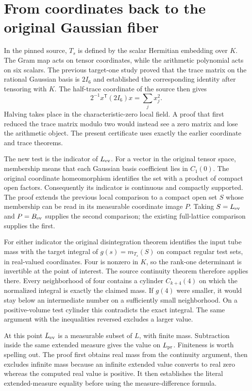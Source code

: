 \documentclass[12pt,letterpaper]{article}
\begin{document}
\section{From coordinates back to the original Gaussian fiber}
In the pinned source, $T_s$ is defined by the scalar Hermitian embedding over $K$. The Gram map acts on tensor coordinates, while the arithmetic polynomial acts on six scalars. The previous target-one study proved that the trace matrix on the rational Gaussian basis is $2I_6$ and established the corresponding identity after tensoring with $K$. The half-trace coordinate of the source then gives
\[
 2^{-1}x^{\mathsf T}(2I_6)x=\sum_j x_j^2 .
\]
Halving takes place in the characteristic-zero local field. A proof that first reduced the trace matrix modulo two would instead see a zero matrix and lose the arithmetic object. The present certificate uses exactly the earlier coordinate and trace theorems.

The new test is the indicator of $L_{\rm ev}$. For a vector in the original tensor space, membership means that each Gaussian basis coefficient lies in $C_1(0)$. The original coordinate homeomorphism identifies the set with a product of compact open factors. Consequently its indicator is continuous and compactly supported. The proof extends the previous local comparison to a compact open set $S$ whose membership can be read in its measurable coordinate image $P$. Taking $S=L_{\rm ev}$ and $P=B_{\rm ev}$ supplies the second comparison; the existing full-lattice comparison supplies the first.

For either indicator the original disintegration theorem identifies the input tube mass with the target integral of $g(s)=m_{T_s}(S)$ on compact regular test sets, in real-valued coordinates. Four is nonzero in $K$, so the rank-one determinant is invertible at the point of interest. The source continuity theorem therefore applies there. Every neighborhood of four contains a cylinder $C_{k+4}(4)$ on which the normalized integral is exactly the claimed mass. If $g(4)$ were smaller, it would stay below an intermediate number on a sufficiently small neighborhood. On a positive-volume test cylinder this contradicts the exact integral. The same argument with the inequalities reversed excludes a larger value.

At this point $L_{\rm ev}$ is a measurable subset of $L$, with finite mass. Subtraction inside the same extended measure gives the value on $L_{\rm pr}$. Finiteness is worth spelling out. The proof first obtains real mass from the continuity argument, then excludes infinite mass because an infinite extended value converts to real zero whereas the computed real value is positive. It then establishes the literal extended-measure equality before using the measure-difference formula.
\end{document}

